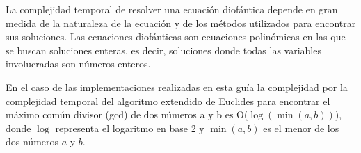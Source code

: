 La complejidad temporal de resolver una ecuación diofántica depende en gran medida de la naturaleza de la ecuación y de los métodos utilizados para encontrar sus soluciones. Las ecuaciones diofánticas son ecuaciones polinómicas en las que se buscan soluciones enteras, es decir, soluciones donde todas las variables involucradas son números enteros.

En el caso de las implementaciones realizadas en esta guía la complejidad por la complejidad temporal del algoritmo extendido de Euclides para encontrar el máximo común divisor (gcd) de dos números a y b es O($\log(\min(a, b))$), donde $\log$ representa el logaritmo en base 2 y $\min(a, b)$ es el menor de los dos números $a$ y $b$.